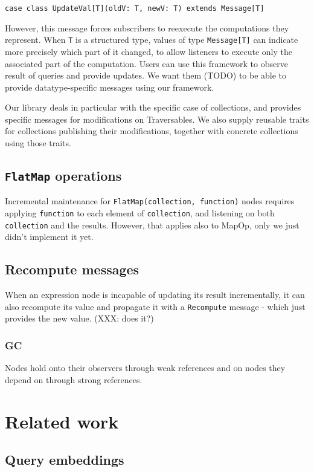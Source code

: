\documentclass{article}
\begin{document}
\texttt{case class UpdateVal{[}T{]}(oldV: T, newV: T) extends Message{[}T{]}}

However, this message forces subscribers to reexecute the computations
they represent. When \texttt{T} is a structured type, values of type
\texttt{Message{[}T{]}} can indicate more precisely which part of it
changed, to allow listeners to execute only the associated part of the
computation. Users can use this framework to observe result of queries
and provide updates. We want them (TODO) to be able to provide
datatype-specific messages using our framework.

Our library deals in particular with the specific case of collections,
and provides specific messages for modifications on Traversables. We
also supply reusable traits for collections publishing their
modifications, together with concrete collections using those traits.

\subsection{\texttt{FlatMap} operations}

Incremental maintenance for \texttt{FlatMap(collection, function)} nodes
requires applying \texttt{function} to each element of
\texttt{collection}, and listening on both \texttt{collection} and the
results. However, that applies also to MapOp, only we just didn't
implement it yet.

\subsection{Recompute messages}

When an expression node is incapable of updating its result
incrementally, it can also recompute its value and propagate it with a
\texttt{Recompute} message - which just provides the new value. (XXX:
does it?)

\subsubsection{GC}

Nodes hold onto their observers through weak references and on nodes
they depend on through strong references.

\section{Related work}

\subsection{Query embeddings}
\end{document}
